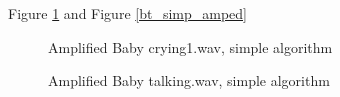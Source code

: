Figure \ref{fig:bc2_simp_amped} and Figure \ref{bt_simp_amped} 

\begin{figure}[H]
  \centering
  \caption{Amplified Baby crying1.wav, simple algorithm}
  \label{fig:bc2_simp_amped}
\end{figure}
\begin{figure}[H]
  \centering
  \caption{Amplified Baby talking.wav, simple algorithm}
  \label{fig:bt_simp_amped}
\end{figure}
